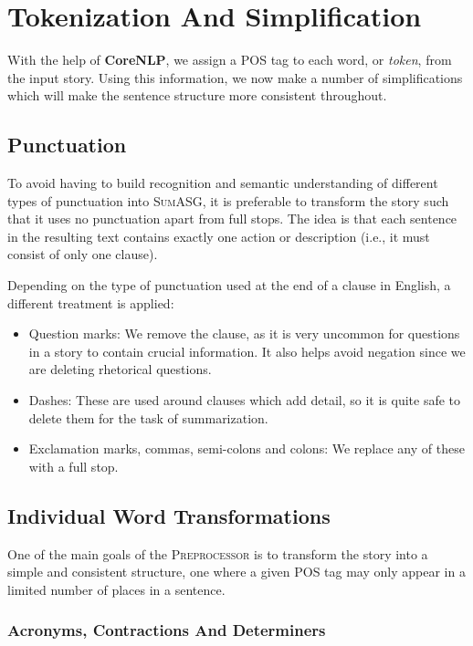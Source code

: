 \section{Tokenization And Simplification}
\label{sec:tokenization_simplification}

With the help of \textbf{CoreNLP}, we assign a POS tag to each word, or \textit{token}, from the input story. Using this information, we now make a number of simplifications which will make the sentence structure more consistent throughout.

\subsection{Punctuation}
\label{subsec:punctuation}

To avoid having to build recognition and semantic understanding of different types of punctuation into \textsc{SumASG}, it is preferable to transform the story such that it uses no punctuation apart from full stops. The idea is that each sentence in the resulting text contains exactly one action or description (i.e., it must consist of only one clause).

Depending on the type of punctuation used at the end of a clause in English, a different treatment is applied:

\begin{itemize}
\item Question marks: We remove the clause, as it is very uncommon for questions in a story to contain crucial information. It also helps avoid negation since we are deleting rhetorical questions.
\item Dashes: These are used around clauses which add detail, so it is quite safe to delete them for the task of summarization.
\item Exclamation marks, commas, semi-colons and colons: We replace any of these with a full stop.
\end{itemize}

\subsection{Individual Word Transformations}

One of the main goals of the \textsc{Preprocessor} is to transform the story into a simple and consistent structure, one where a given POS tag may only appear in a limited number of places in a sentence.

\subsubsection*{Acronyms, Contractions And Determiners}

